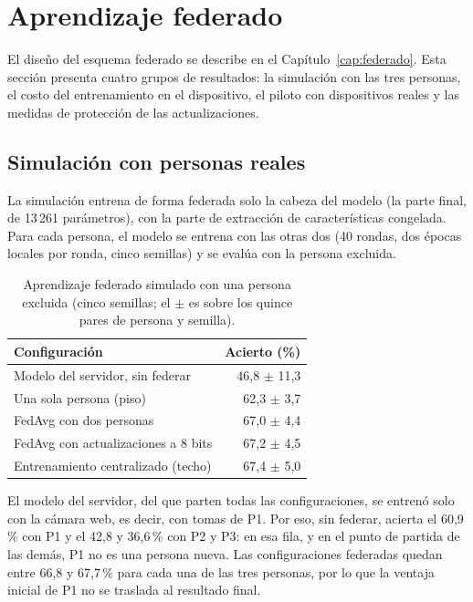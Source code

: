 \section{Aprendizaje federado}
\label{sec:res-federado}

El diseño del esquema federado se describe en el Capítulo~\ref{cap:federado}. Esta sección presenta cuatro grupos de resultados: la simulación con las tres personas, el costo del entrenamiento en el dispositivo, el piloto con dispositivos reales y las medidas de protección de las actualizaciones.

\subsection{Simulación con personas reales}

La simulación entrena de forma federada solo la cabeza del modelo (la parte final, de 13\,261 parámetros), con la parte de extracción de características congelada. Para cada persona, el modelo se entrena con las otras dos (40 rondas, dos épocas locales por ronda, cinco semillas) y se evalúa con la persona excluida.

\begin{table}[h]
    \centering
    \begin{tabular}{lr}
        \toprule
        Configuración & Acierto (\%) \\
        \midrule
        Modelo del servidor, sin federar & 46,8 $\pm$ 11,3 \\
        Una sola persona (piso) & 62,3 $\pm$ 3,7 \\
        FedAvg con dos personas & 67,0 $\pm$ 4,4 \\
        FedAvg con actualizaciones a 8 bits & 67,2 $\pm$ 4,5 \\
        Entrenamiento centralizado (techo) & 67,4 $\pm$ 5,0 \\
        \bottomrule
    \end{tabular}
    \caption{Aprendizaje federado simulado con una persona excluida (cinco semillas; el $\pm$ es sobre los quince pares de persona y semilla).}
    \label{tab:federado-simulado}
\end{table}

El modelo del servidor, del que parten todas las configuraciones, se entrenó solo con la cámara web, es decir, con tomas de P1. Por eso, sin federar, acierta el 60,9\,\% con P1 y el 42,8 y 36,6\,\% con P2 y P3: en esa fila, y en el punto de partida de las demás, P1 no es una persona nueva. Las configuraciones federadas quedan entre 66,8 y 67,7\,\% para cada una de las tres personas, por lo que la ventaja inicial de P1 no se traslada al resultado final.

